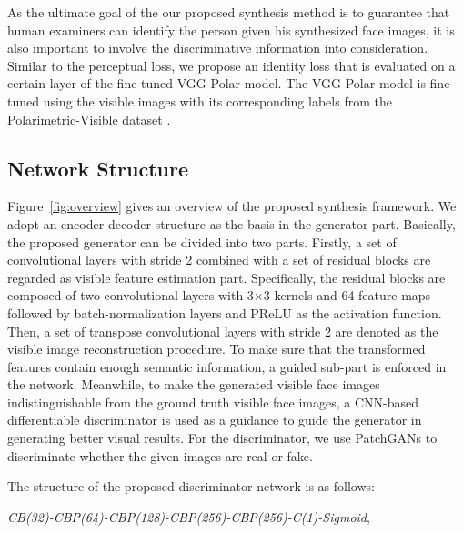 \documentclass[10pt,twocolumn,letterpaper]{article}
\begin{document}
As the ultimate goal of the our proposed synthesis method is to guarantee that human examiners can identify the person given his synthesized face images, it is also important to involve the discriminative information into consideration.  Similar to the perceptual loss, we propose an identity loss that is evaluated on a certain layer of the fine-tuned VGG-Polar model. The VGG-Polar model is fine-tuned using the visible images with its corresponding labels from the Polarimetric-Visible dataset \cite{ijcb_datasets2}. 


\subsection{Network Structure}
Figure~\ref{fig:overview} gives an overview of the proposed synthesis framework.  We adopt an encoder-decoder structure as the basis in the generator part.  Basically, the proposed generator can be divided into two parts. Firstly, a set of convolutional layers with stride 2 combined with a set of residual blocks \cite{perceptual_loss} are regarded as visible feature estimation part. Specifically, the residual blocks are composed of two convolutional layers with 3$\times3$ kernels and 64 feature maps followed by batch-normalization layers \cite{batch_norm} and PReLU \cite{prelu} as the activation function. Then, a set of transpose convolutional layers with stride 2 are denoted as the visible image reconstruction procedure.   To make sure that the transformed features contain enough semantic information, a guided sub-part is enforced in the network. Meanwhile, to make the generated visible face images indistinguishable from the ground truth visible face images, a CNN-based differentiable discriminator is used as a guidance to guide the generator in generating better visual results. For the discriminator, we use PatchGANs \cite{GAN_pix2pix2016} to discriminate whether the given images are real or fake.

The structure of the proposed discriminator network is as follows: 

\noindent \emph{CB(32)-CBP(64)-CBP(128)-CBP(256)-CBP(256)-C(1)-Sigmoid},\\
\end{document}
